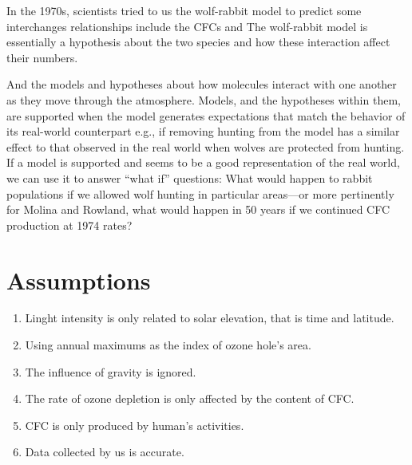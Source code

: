\documentclass[12pt]{article}
\newtheorem{definition}{{definition}}
\newcounter{numdefinition}
\renewenvironment{definition}[1]
{\noindent\stepcounter{numdefinition}
\slshape Definition \arabic{numdefinition} \textsf{#1 :}
\begin{quote}\small\itshape}
{\end{quote}}
\begin{document}
In the 1970s, scientists tried to us the wolf-rabbit model to predict some interchanges relationships include the CFCs and  The wolf-rabbit model is essentially a hypothesis about the two species and how these interaction affect their numbers. 

And the models and hypotheses about how molecules interact with one another as they move through the atmosphere. Models, and the hypotheses within them, are supported when the model generates expectations that match the behavior of its real-world counterpart e.g., if removing hunting from the model has a similar effect to that observed in the real world when wolves are protected from hunting. If a model is supported and seems to be a good representation of the real world, we can use it to answer “what if” questions: What would happen to rabbit populations if we allowed wolf hunting in particular areas—or more pertinently for Molina and Rowland, what would happen in 50 years if we continued CFC production at 1974 rates?



%  
%
%
%
%

\newpage
\section{Assumptions}
\begin{enumerate}
\item  Linght intensity is only related to solar elevation, that is time and latitude. 
\item Using annual maximums as the index of ozone hole's area.
\item The influence of gravity is ignored.
\item The rate of ozone depletion is only affected by the content of CFC.
\item CFC is only produced by human’s activities.
\item Data collected by us is accurate.
\end{enumerate}
\end{document}
